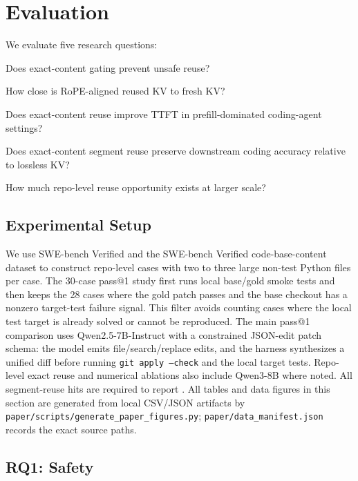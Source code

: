 \section{Evaluation}

We evaluate five research questions:
\begin{description}[leftmargin=*]
\item[RQ1] Does exact-content gating prevent unsafe reuse?
\item[RQ2] How close is RoPE-aligned reused KV to fresh KV?
\item[RQ3] Does exact-content reuse improve TTFT in prefill-dominated coding-agent settings?
\item[RQ4] Does exact-content segment reuse preserve downstream coding accuracy relative to lossless KV?
\item[RQ5] How much repo-level reuse opportunity exists at larger scale?
\end{description}

\subsection{Experimental Setup}

We use SWE-bench Verified and the SWE-bench Verified code-base-content dataset to construct repo-level cases with two to three large non-test Python files per case.
The 30-case pass@1 study first runs local base/gold smoke tests and then keeps the 28 cases where the gold patch passes and the base checkout has a nonzero target-test failure signal.
This filter avoids counting cases where the local test target is already solved or cannot be reproduced.
The main pass@1 comparison uses Qwen2.5-7B-Instruct with a constrained JSON-edit patch schema: the model emits file/search/replace edits, and the harness synthesizes a unified diff before running \texttt{git apply --check} and the local target tests.
Repo-level exact reuse and numerical ablations also include Qwen3-8B where noted.
All segment-reuse hits are required to report \exactgate.
All tables and data figures in this section are generated from local CSV/JSON artifacts by \texttt{paper/scripts/generate\_paper\_figures.py}; \texttt{paper/data\_manifest.json} records the exact source paths.

\subsection{RQ1: Safety}



